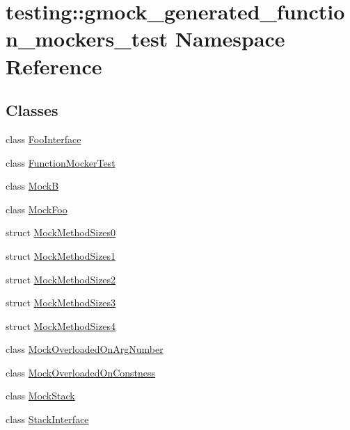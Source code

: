 \hypertarget{namespacetesting_1_1gmock__generated__function__mockers__test}{}\section{testing\+::gmock\+\_\+generated\+\_\+function\+\_\+mockers\+\_\+test Namespace Reference}
\label{namespacetesting_1_1gmock__generated__function__mockers__test}
\subsection*{Classes}
\begin{DoxyCompactItemize}
\item 
class \mbox{\hyperlink{classtesting_1_1gmock__generated__function__mockers__test_1_1FooInterface}{Foo\+Interface}}
\item 
class \mbox{\hyperlink{classtesting_1_1gmock__generated__function__mockers__test_1_1FunctionMockerTest}{Function\+Mocker\+Test}}
\item 
class \mbox{\hyperlink{classtesting_1_1gmock__generated__function__mockers__test_1_1MockB}{MockB}}
\item 
class \mbox{\hyperlink{classtesting_1_1gmock__generated__function__mockers__test_1_1MockFoo}{Mock\+Foo}}
\item 
struct \mbox{\hyperlink{structtesting_1_1gmock__generated__function__mockers__test_1_1MockMethodSizes0}{Mock\+Method\+Sizes0}}
\item 
struct \mbox{\hyperlink{structtesting_1_1gmock__generated__function__mockers__test_1_1MockMethodSizes1}{Mock\+Method\+Sizes1}}
\item 
struct \mbox{\hyperlink{structtesting_1_1gmock__generated__function__mockers__test_1_1MockMethodSizes2}{Mock\+Method\+Sizes2}}
\item 
struct \mbox{\hyperlink{structtesting_1_1gmock__generated__function__mockers__test_1_1MockMethodSizes3}{Mock\+Method\+Sizes3}}
\item 
struct \mbox{\hyperlink{structtesting_1_1gmock__generated__function__mockers__test_1_1MockMethodSizes4}{Mock\+Method\+Sizes4}}
\item 
class \mbox{\hyperlink{classtesting_1_1gmock__generated__function__mockers__test_1_1MockOverloadedOnArgNumber}{Mock\+Overloaded\+On\+Arg\+Number}}
\item 
class \mbox{\hyperlink{classtesting_1_1gmock__generated__function__mockers__test_1_1MockOverloadedOnConstness}{Mock\+Overloaded\+On\+Constness}}
\item 
class \mbox{\hyperlink{classtesting_1_1gmock__generated__function__mockers__test_1_1MockStack}{Mock\+Stack}}
\item 
class \mbox{\hyperlink{classtesting_1_1gmock__generated__function__mockers__test_1_1StackInterface}{Stack\+Interface}}
\end{DoxyCompactItemize}
